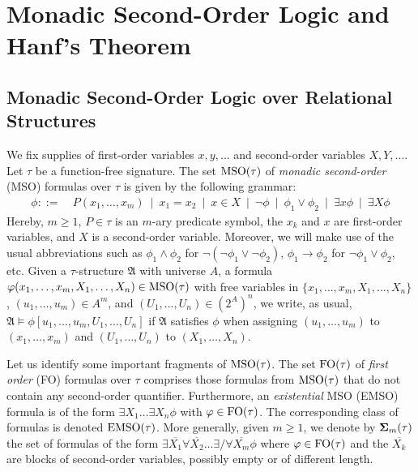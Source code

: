 \documentclass{LMCS}
\begin{document}
\section{Monadic Second-Order Logic and Hanf's Theorem}\label{sec:MSO}

\subsection{Monadic Second-Order Logic over Relational Structures}

We fix supplies of first-order variables $x,y,\ldots$ and second-order
variables $X,Y,\ldots$. Let $\tau$ be a function-free signature. The set
$\textup{MSO}(\tau)$ of \emph{monadic second-order} (MSO) formulas over $\tau$ is
given by the following grammar:
\begin{align*}
  \phi ::= &~ P(x_1,\ldots,x_m) ~\mid~ x_1 = x_2 ~\mid~ x \in X ~\mid~ \neg
  \phi ~\mid~ \phi_1 \vee \phi_2 ~\mid~ \exists x \phi ~\mid~ \exists X \phi
\end{align*}
Hereby, $m \ge 1$, $P \in \tau$ is an $m$-ary predicate symbol, the $x_k$ and
$x$ are first-order variables, and $X$ is a second-order variable.
Moreover, we will make use of the usual abbreviations such as $\phi_1
\mathrel{\wedge} \phi_2$ for $\neg(\neg \phi_1 \vee \neg\phi_2)$, $\phi_1
\rightarrow \phi_2$ for $\neg \phi_1 \vee \phi_2$, etc. Given a
$\tau$-structure $\mathfrak{A}$ with universe $A$, a formula
$\varphi(x_1,\ldots,x_m,X_1,\ldots,X_n) \in \textup{MSO}(\tau)$ with free variables in
$\{x_1,\ldots,x_m,X_1,\ldots,X_n\}$, $(u_1,\ldots,u_m) \in A^m$, and
$(U_1,\ldots,U_n) \in {(2^A)}^n$, we write, as usual, $\mathfrak{A} \models
\phi[u_1,\ldots,u_m,U_1,\ldots,U_n]$ if $\mathfrak{A}$ satisfies $\phi$ when
assigning $(u_1,\ldots,u_m)$ to $(x_1,\ldots,x_m)$ and $(U_1,\ldots,U_n)$ to
$(X_1,\ldots,X_n)$.

Let us identify some important fragments of $\textup{MSO}(\tau)$. The set $\textup{FO}(\tau)$
of \emph{first order} (FO) formulas over $\tau$ comprises those formulas from
$\textup{MSO}(\tau)$ that do not contain any second-order quantifier. Furthermore, an
\emph{existential} MSO (EMSO) formula is of the form $\exists X_1 \ldots
\exists X_n \phi$ with $\varphi \in \textup{FO}(\tau)$. The corresponding class of
formulas is denoted $\textup{EMSO}(\tau)$. More generally, given $m \ge 1$, we denote
by ${\bf{\Sigma}}_m(\tau)$ the set of formulas of the form $\exists \overline{X_1}
\forall \overline{X_2} \ldots \exists / \forall \overline{X_m} \phi$ where
$\varphi \in \textup{FO}(\tau)$ and the $\overline{X_k}$ are blocks of second-order
variables, possibly empty or of different length.
\end{document}
